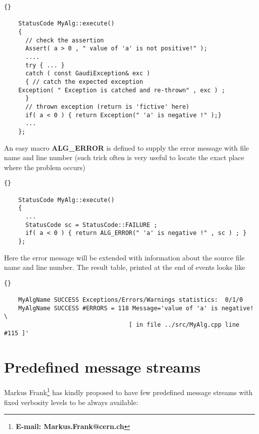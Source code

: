 \documentclass{lhcbnote}
\newcommand{\bftt}         {\ttfamily\bfseries}
\begin{document}
\begin{scriptsize}
 \begin{lstlisting}{}

    StatusCode MyAlg::execute() 
    {
      // check the assertion 
      Assert( a > 0 , " value of 'a' is not positive!" );
      ....
      try { ... } 
      catch ( const GaudiException& exc ) 
      { // catch the expected exception
	Exception( " Exception is catched and re-thrown" , exc ) ;
      }
      // thrown exception (return is 'fictive' here)
      if( a < 0 ) { return Exception(" 'a' is negative !" );}
      ...
    };

 \end{lstlisting}
\end{scriptsize}

An easy macro {\bftt{ALG\_ERROR}} is defined 
to supply the error message with file name and line number 
(such trick often is very useful to locate the exact place where 
the problem occurs)

\begin{scriptsize}
 \begin{lstlisting}{}

    StatusCode MyAlg::execute() 
    {
      ...
      StatusCode sc = StatusCode::FAILURE ;
      if( a < 0 ) { return ALG_ERROR(" 'a' is negative !" , sc ) ; }
    };

 \end{lstlisting}
\end{scriptsize}

 Here the error message will be extended with information
about the source file name and line number.
The result table, printed at the end of events looks like 

\begin{scriptsize}
  \begin{lstlisting}{}

    MyAlgName SUCCESS Exceptions/Errors/Warnings statistics:  0/1/0
    MyAlgName SUCCESS #ERRORS = 118 Message='value of 'a' is negative! \ 
                                   [ in file ../src/MyAlg.cpp line #115 ]'
  \end{lstlisting}
\end{scriptsize}


\section{Predefined message streams}
Markus Frank\footnote{\bftt{E-mail: Markus.Frank@cern.ch}} has kindly proposed to have few predefined message 
streams with fixed verbosity levels to be always available:
\end{document}
